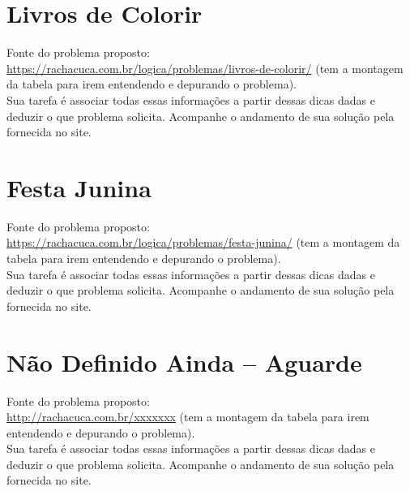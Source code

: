 \documentclass[a4paper,12pt]{article}
\begin{document}
\newpage
\tableofcontents


\newpage
\section{Livros de Colorir}

 Fonte do problema proposto:\\
 \url{https://rachacuca.com.br/logica/problemas/livros-de-colorir/}
 (tem a montagem da tabela para irem entendendo e depurando o problema).\\


\vspace{1.5cm}
 Sua tarefa é associar todas essas informações a partir dessas dicas dadas e deduzir o que problema solicita. Acompanhe o andamento de sua solução pela fornecida no site.
\newpage
\section{Festa Junina}

 Fonte do problema proposto:\\
 \url{https://rachacuca.com.br/logica/problemas/festa-junina/}
 (tem a montagem da tabela para irem entendendo e depurando o problema).\\


\vspace{1.5cm}
 Sua tarefa é associar todas essas informações a partir dessas dicas dadas e deduzir o que problema solicita. Acompanhe o andamento de sua solução pela fornecida no site.
\newpage
\section{Não Definido Ainda -- Aguarde}

 Fonte do problema proposto:\\
 \url{http://rachacuca.com.br/xxxxxxx}
 (tem a montagem da tabela para irem entendendo e depurando o problema).\\

\vspace{1.5cm}
 Sua tarefa é associar todas essas informações a partir dessas dicas dadas e deduzir o que problema solicita. Acompanhe o andamento de sua solução pela fornecida no site.
\end{document}
